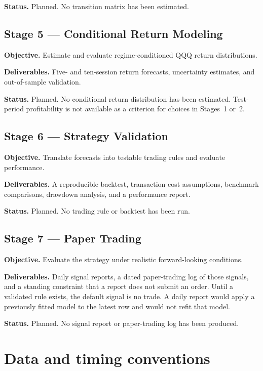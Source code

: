 \documentclass[11pt]{article}
\begin{document}
\textbf{Status.} Planned.
No transition matrix has been estimated.

\subsection{Stage 5 --- Conditional Return Modeling}

\textbf{Objective.} Estimate and evaluate regime-conditioned QQQ return distributions.

\textbf{Deliverables.} Five- and ten-session return forecasts, uncertainty estimates, and out-of-sample validation.

\textbf{Status.} Planned.
No conditional return distribution has been estimated.
Test-period profitability is not available as a criterion for choices in Stages~1 or~2.

\subsection{Stage 6 --- Strategy Validation}

\textbf{Objective.} Translate forecasts into testable trading rules and evaluate performance.

\textbf{Deliverables.} A reproducible backtest, transaction-cost assumptions, benchmark comparisons, drawdown analysis, and a performance report.

\textbf{Status.} Planned.
No trading rule or backtest has been run.

\subsection{Stage 7 --- Paper Trading}

\textbf{Objective.} Evaluate the strategy under realistic forward-looking conditions.

\textbf{Deliverables.} Daily signal reports, a dated paper-trading log of those signals, and a standing constraint that a report does not submit an order.
Until a validated rule exists, the default signal is no trade.
A daily report would apply a previously fitted model to the latest row and would not refit that model.

\textbf{Status.} Planned.
No signal report or paper-trading log has been produced.

\section{Data and timing conventions}
\label{sec:data}
\end{document}

